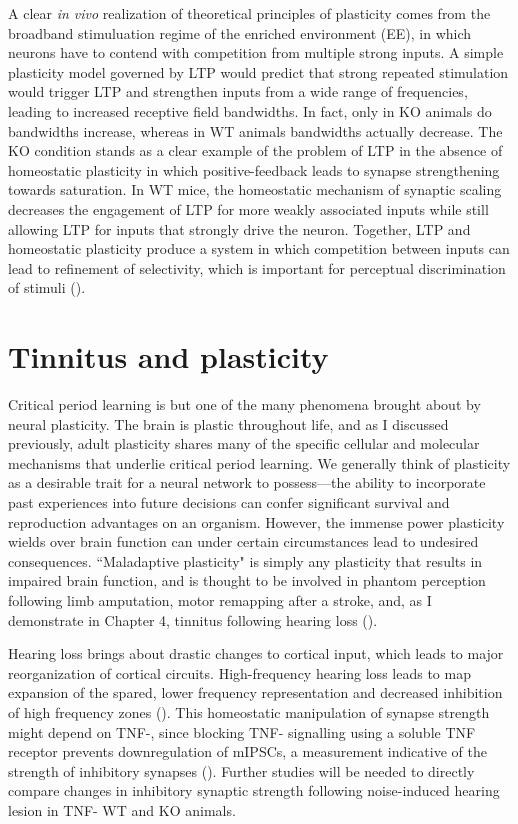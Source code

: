 A clear \textit{in vivo} realization of theoretical principles of plasticity comes from the broadband stimuluation regime of the enriched environment (EE), in which neurons have to contend with competition from multiple strong inputs. A simple plasticity model governed by LTP would predict that strong repeated stimulation would trigger LTP and strengthen inputs from a wide range of frequencies, leading to increased receptive field bandwidths. In fact, only in KO animals do bandwidths increase, whereas in WT animals bandwidths actually decrease. The KO condition stands as a clear example of the problem of LTP in the absence of homeostatic plasticity in which positive-feedback leads to synapse strengthening towards saturation. In WT mice, the homeostatic mechanism of synaptic scaling decreases the engagement of LTP for more weakly associated inputs while still allowing LTP for inputs that strongly drive the neuron. Together, LTP and homeostatic plasticity produce a system in which competition between inputs can lead to refinement of selectivity, which is important for perceptual discrimination of stimuli (\cite{Han2007}).

\section{Tinnitus and plasticity}

Critical period learning is but one of the many phenomena brought about by neural plasticity. The brain is plastic throughout life, and as I discussed previously, adult plasticity shares many of the specific cellular and molecular mechanisms that underlie critical period learning. We generally think of plasticity as a desirable trait for a neural network to possess---the ability to incorporate past experiences into future decisions can confer significant survival and reproduction advantages on an organism. However, the immense power plasticity wields over brain function can under certain circumstances lead to undesired consequences. ``Maladaptive plasticity" is simply any plasticity that results in impaired brain function, and is thought to be involved in phantom perception following limb amputation, motor remapping after a stroke, and, as I demonstrate in Chapter 4, tinnitus following hearing loss (\cite{Flor2006, Takeuchi2012}).

Hearing loss brings about drastic changes to cortical input, which leads to major reorganization of cortical circuits. High-frequency hearing loss leads to map expansion of the spared, lower frequency representation and decreased inhibition of high frequency zones (\cite{Yang2013}). This homeostatic manipulation of synapse strength might depend on TNF-\textalpha{}, since blocking TNF-\textalpha{} signalling using a soluble TNF receptor prevents downregulation of mIPSCs, a measurement indicative of the strength of inhibitory synapses (\cite{Stellwagen2006}). Further studies will be needed to directly compare changes in inhibitory synaptic strength following noise-induced hearing lesion in TNF-\textalpha{} WT and KO animals.

